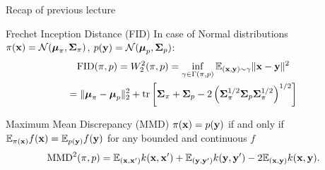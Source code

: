 \begin{frame}{Recap of previous lecture}
	\vspace{-0.3cm}
	\begin{block}{Frechet Inception Distance (FID)}
		In case of Normal distributions $\pi(\mathbf{x}) = \mathcal{N}(\boldsymbol{\mu}_\pi, \boldsymbol{\Sigma}_\pi)$, $p(\mathbf{y}) = \mathcal{N}(\boldsymbol{\mu}_p, \boldsymbol{\Sigma}_p)$:
		\vspace{-0.3cm}
		\begin{multline*}
			\text{FID} (\pi, p) =  W_2^2(\pi, p) = \inf_{\gamma \in \Gamma(\pi, p)} \mathbb{E}_{(\mathbf{x}, \mathbf{y}) \sim \gamma} \| \mathbf{x} - \mathbf{y} \|^2 \\
			= \| \boldsymbol{\mu}_{\pi} - \boldsymbol{\mu}_{p}\|_2^2 + \text{tr} \left[ \boldsymbol{\Sigma}_{\pi} + \boldsymbol{\Sigma}_p - 2 \left(\boldsymbol{\Sigma}_{\pi}^{1/2} \boldsymbol{\Sigma}_p \boldsymbol{\Sigma}_{\pi}^{1/2} \right)^{1/2} \right]
		\end{multline*}
		\vspace{-0.6cm}
	\end{block}		
	\begin{block}{Maximum Mean Discrepancy (MMD)}
		$\pi(\mathbf{x}) = p(\mathbf{y})$ if and only if $\mathbb{E}_{\pi(\mathbf{x})} f(\mathbf{x}) = \mathbb{E}_{p(\mathbf{y})} f(\mathbf{y})$ for any bounded and continuous $f$
		\[
			\text{MMD}^2(\pi, p) = \mathbb{E}_{(\mathbf{x}, \mathbf{x}')} k(\mathbf{x}, \mathbf{x}') + \mathbb{E}_{(\mathbf{y}, \mathbf{y}')} k(\mathbf{y}, \mathbf{y}') - 2 \mathbb{E}_{(\mathbf{x}, \mathbf{y})} k(\mathbf{x}, \mathbf{y}).
		\]
	\end{block}		
	
\end{frame}
